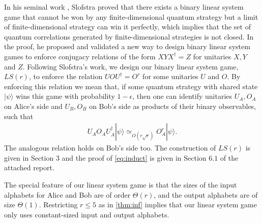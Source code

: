 \documentclass[11pt,letterpaper]{article}
\newcommand{\ket}[1]{|#1\rangle}
\newcommand{\x}{\otimes}
\newcommand{\ct}{^{\dagger}}
\newcommand{\1}{\mathbb{1}}
\newcommand{\LS}{LS}
\newcommand{\ep}{\epsilon}
\newcommand{\se}{\sqrt{\epsilon}}
\newcommand{\appd}[1]{\simeq_{#1}}
\theoremstyle{definition}
\begin{document}
In his seminal work \cite{slofstra2017}, Slofstra proved that 
there exists a binary linear system game that cannot be won by any finite-dimensional quantum strategy but a limit of 
finite-dimensional strategy can win it perfectly,
which implies that the set of quantum correlations generated by
finite-dimensional strategies is not closed.
In the proof, he proposed and validated a new way 
to design binary linear system games to enforce conjugacy relations of the
form $X Y X\ct = Z$ for unitaries $X, Y$ and $Z$.
Following Slofstra's work, we design our binary linear system game, $\LS(r)$,
to enforce the relation $U O U\ct = O^r$ for some unitaries $U$ and $O$.
By enforcing this relation we mean that, 
if some quantum strategy with shared state $\ket{\psi}$
wins this game with probability $1 - \ep$,
then one can identify unitaries $U_A, O_A$ on Alice's side and
$U_B, O_B$ on Bob's side as products of their binary observables, such that 
\begin{align}
\label{eq:induct}
	 U_A O_A U_A\ct \ket{\psi} \appd{O(r \se)}  O_A^{r} \ket{\psi}.
\end{align}
The analogous relation holds on Bob's side too.
The construction of $\LS(r)$ is given in Section $3$ and
the proof of \cref{eq:induct} is given in Section $6.1$ of the attached report.


The special feature of our linear system game is that the sizes
of the input alphabets for Alice and Bob are of order $\Theta(r)$,
and the output alphabets are of size $\Theta(1)$.
Restricting $r \leq 5$ as in \cref{thm:inf} implies that our linear system 
game only uses constant-sized input and output alphabets.

\end{document}
